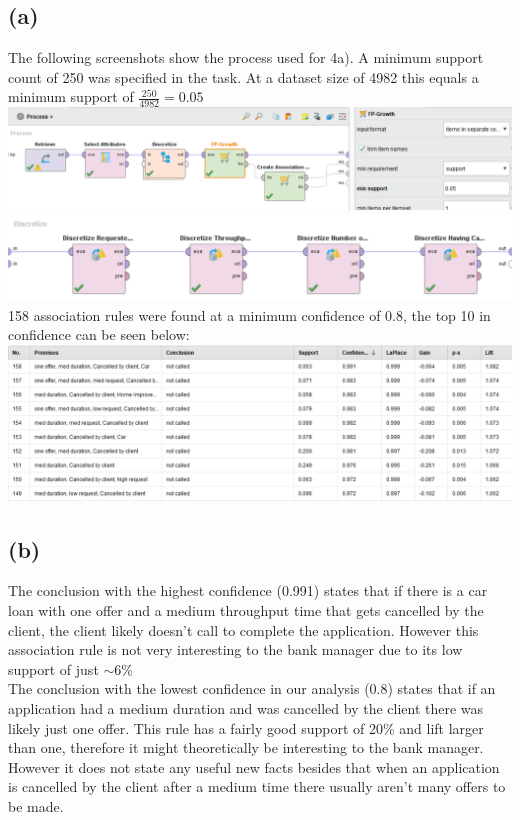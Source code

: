 \documentclass[../../main.tex]{subfiles}
\begin{document}
\subsection*{(a)}
The following screenshots show the process used for 4a). A minimum support count of 250 was specified in the task. At a dataset size of 4982 this equals a minimum support of $\frac{250}{4982}=0.05$\\
\includegraphics[width=\textwidth]{img/QUESTION_4a_PROCESS_overview.png}
\includegraphics[width=\textwidth]{img/QUESTION_4a_PROCESS_discretize.png}
158 association rules were found at a minimum confidence of 0.8, the top 10 in confidence can be seen below:\\
\includegraphics[width=\textwidth]{img/QUESTION_4a_association_rules.png}

\subsection*{(b)}
The conclusion with the highest confidence (0.991) states that if there is a car loan with one offer and a medium throughput time that gets cancelled by the client, the client likely doesn't call to complete the application. However this association rule is not very interesting to the bank manager due to its low support of just $\sim6\%$\\
The conclusion with the lowest confidence in our analysis (0.8) states that if an application had a medium duration and was cancelled by the client there was likely just one offer. This rule has a fairly good support of 20\% and lift larger than one, therefore it might theoretically be interesting to the bank manager. However it does not state any useful new facts besides that when an application is cancelled by the client after a medium time there usually aren't many offers to be made.
\end{document}
